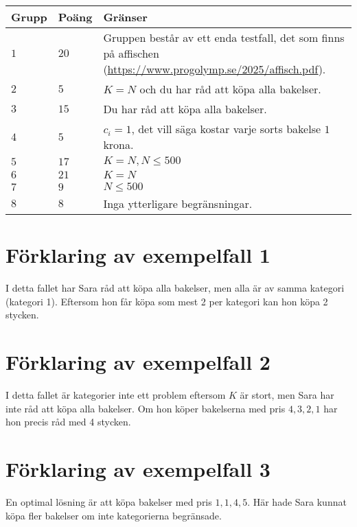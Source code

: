 \noindent
\begin{tabular}{| l | l | p{12cm} |}
  \hline
  \textbf{Grupp} & \textbf{Poäng} & \textbf{Gränser} \\ \hline
  $1$    & $20$       & Gruppen består av ett enda testfall, det som finns på affischen (\url{https://www.progolymp.se/2025/affisch.pdf}). \\ \hline 
  $2$    & $5$        & $K=N$ och du har råd att köpa alla bakelser. \\ \hline
  $3$    & $15$       & Du har råd att köpa alla bakelser. \\ \hline
  $4$    & $5$        & $c_i=1$, det vill säga kostar varje sorts bakelse $1$ krona. \\ \hline
  $5$    & $17$       & $K=N, N \leq 500$ \\ \hline
  $6$    & $21$       & $K=N$ \\ \hline
  $7$    & $9$        & $N \leq 500$ \\ \hline
  $8$    & $8$        & Inga ytterligare begränsningar. \\ \hline
\end{tabular}

\section*{Förklaring av exempelfall 1}
I detta fallet har Sara råd att köpa alla bakelser, men alla är av samma kategori (kategori 1). Eftersom hon får köpa som mest 2 per kategori
kan hon köpa 2 stycken.

\section*{Förklaring av exempelfall 2}
I detta fallet är kategorier inte ett problem eftersom $K$ är stort, men Sara har inte råd att köpa alla bakelser. Om hon köper bakelserna med
pris $4, 3, 2, 1$ har hon precis råd med 4 stycken.

\section*{Förklaring av exempelfall 3}
En optimal lösning är att köpa bakelser med pris $1,1,4,5$. Här hade Sara kunnat köpa fler bakelser om inte kategorierna begränsade.

